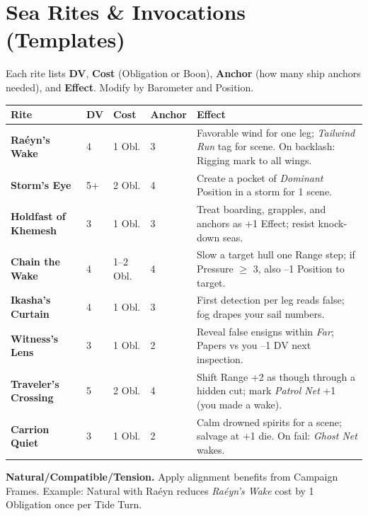 \documentclass[11pt,oneside]{book}
\begin{document}
\section{Sea Rites \& Invocations (Templates)}

\noindent Each rite lists \textbf{DV}, \textbf{Cost} (Obligation or Boon), \textbf{Anchor} (how many ship anchors needed), and \textbf{Effect}. Modify by Barometer and Position.

\begin{tabularx}{\linewidth}{@{}p{3.5cm} p{1.3cm} p{1.5cm} p{1.4cm} X@{}}
\toprule
\textbf{Rite} & \textbf{DV} & \textbf{Cost} & \textbf{Anchor} & \textbf{Effect}\\
\midrule
\textbf{Raéyn's Wake} & 4 & 1 Obl. & 3 & Favorable wind for one leg; \emph{Tailwind Run} tag for scene. On backlash: Rigging mark to all wings.\\
\textbf{Storm's Eye} & 5+ & 2 Obl. & 4 & Create a pocket of \emph{Dominant} Position in a storm for 1 scene.\\
\textbf{Holdfast of Khemesh} & 3 & 1 Obl. & 3 & Treat boarding, grapples, and anchors as +1 Effect; resist knock-down seas.\\
\textbf{Chain the Wake} & 4 & 1--2 Obl. & 4 & Slow a target hull one Range step; if Pressure \(\geq\) 3, also --1 Position to target.\\
\textbf{Ikasha's Curtain} & 4 & 1 Obl. & 3 & First detection per leg reads false; fog drapes your sail numbers.\\
\textbf{Witness's Lens} & 3 & 1 Obl. & 2 & Reveal false ensigns within \emph{Far}; Papers vs you --1 DV next inspection.\\
\textbf{Traveler's Crossing} & 5 & 2 Obl. & 4 & Shift Range +2 as though through a hidden cut; mark \emph{Patrol Net} +1 (you made a wake).\\
\textbf{Carrion Quiet} & 3 & 1 Obl. & 2 & Calm drowned spirits for a scene; salvage at +1 die. On fail: \emph{Ghost Net} wakes.\\
\bottomrule
\end{tabularx}

\begin{tcolorbox}[breakable]
\textbf{Natural/Compatible/Tension.} Apply alignment benefits from Campaign Frames. Example: Natural with Raéyn reduces \emph{Raéyn's Wake} cost by 1 Obligation once per Tide Turn.
\end{tcolorbox}
\end{document}
